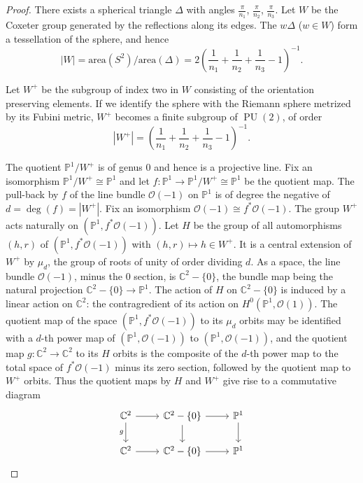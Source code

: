\documentclass[12pt,a4paper]{article}
\theoremstyle{plain}
\theoremstyle{definition}
\theoremstyle{remark}
\DeclareMathOperator{\PU}{PU}
\begin{document}
\begin{proof}
There exists a spherical triangle $\Delta$ with angles $\frac{\pi}{n_1}$, $\frac{\pi}{n_2}$, $\frac{\pi}{n_3}$. Let $W$ be the Coxeter group generated by the reflections along its edges. The $w\Delta$ ($w \in W$) form a tessellation of the sphere, and hence
\[
|W| = \text{area}(S^2)/\text{area}(\Delta) = 2 \left( \frac{1}{n_1} + \frac{1}{n_2} + \frac{1}{n_3} - 1 \right)^{-1}.
\]

Let $W^+$ be the subgroup of index two in $W$ consisting of the orientation preserving elements. If we identify the sphere with the Riemann sphere metrized by its Fubini metric, $W^+$ becomes a finite subgroup of $\PU(2)$, of order
\[
|W^+| = \left( \frac{1}{n_1} + \frac{1}{n_2} + \frac{1}{n_3} - 1 \right)^{-1}.
\]

The quotient $\mathbb{P}^1/W^+$ is of genus $0$ and hence is a projective line. Fix an isomorphism $\mathbb{P}^1/W^+ \cong \mathbb{P}^1$ and let $f : \mathbb{P}^1 \to \mathbb{P}^1/W^+ \cong \mathbb{P}^1$ be the quotient map. The pull-back by $f$ of the line bundle $\mathscr{O}(-1)$ on $\mathbb{P}^1$ is of degree the negative of $d = \deg(f) = |W^+|$. Fix an isomorphism $\mathscr{O}(-1) \cong f^*\mathscr{O}(-1)$. The group $W^+$ acts naturally on $(\mathbb{P}^1, f^*\mathscr{O}(-1))$. Let $H$ be the group of all automorphisms $(h, r)$ of $(\mathbb{P}^1, f^*\mathscr{O}(-1))$ with $(h, r) \mapsto h \in W^+$. It is a central extension of $W^+$ by $\mu_d$, the group of roots of unity of order dividing $d$. As a space, the line bundle $\mathscr{O}(-1)$, minus the $0$ section, is $\mathbb{C}^2 - \{0\}$, the bundle map being the natural projection $\mathbb{C}^2 - \{0\} \to \mathbb{P}^1$. The action of $H$ on $\mathbb{C}^2 - \{0\}$ is induced by a linear action on $\mathbb{C}^2$: the contragredient of its action on $H^0(\mathbb{P}^1, \mathscr{O}(1))$. The quotient map of the space $(\mathbb{P}^1, f^*\mathscr{O}(-1))$ to its $\mu_d$ orbits may be identified with a $d$-th power map of $(\mathbb{P}^1, \mathscr{O}(-1))$ to $(\mathbb{P}^1, \mathscr{O}(-1))$, and the quotient map $g : \mathbb{C}^2 \to \mathbb{C}^2$ to its $H$ orbits is the composite of the $d$-th power map to the total space of $f^*\mathscr{O}(-1)$ minus its zero section, followed by the quotient map to $W^+$ orbits. Thus the quotient maps by $H$ and $W^+$ give rise to a commutative diagram
\[
\begin{tikzcd}
\mathbb{C}^2 \arrow[r] \arrow[d, "g"'] & \mathbb{C}^2 - \{0\} \arrow[r] \arrow[d] & \mathbb{P}^1 \arrow[d] \\
\mathbb{C}^2 \arrow[r] & \mathbb{C}^2 - \{0\} \arrow[r] & \mathbb{P}^1
\end{tikzcd}
\]


\end{proof}
\end{document}
